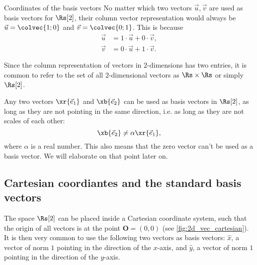 \begin{note}{Coordinates of the basis vectors}{}
  No matter which two vectors $\vec{u}, \vec{v}$ are used as basis vectors for $\Rs[2]$, their column vector representation would always be $\vec{u}=\colvec{1;0}$ and $\vec{v}=\colvec{0;1}$. This is because
  \begin{align*}
    \vec{u} &= 1\cdot\vec{u}+ 0\cdot\vec{v},\\
    \vec{v} &= 0\cdot\vec{u} + 1\cdot\vec{v}.
  \end{align*}
\end{note}

Since the column representation of vectors in $2$-dimensions has two entries, it is common to refer to the set of all $2$-dimensional vectors as $\Rs\times\Rs$ or simply $\Rs[2]$.

Any two vectors $\xr{\vec{e}_{1}}$ and $\xb{\vec{e}_{2}}$ can be used as basis vectors in $\Rs[2]$, as long as they are not pointing in the same direction, i.e. as long as they are not scales of each other:
\begin{equation}
  \xb{\vec{e}_{2}} \neq \alpha\xr{\vec{e}_{1}},
  \label{eq:basis_vectors_not_scales}
\end{equation}
where $\alpha$ is a real number. This also means that the zero vector can't be used as a basis vector. We will elaborate on that point later on.

\subsection{Cartesian coordiantes and the standard basis vectors}

The space $\Rs[2]$ can be placed inside a Cartesian coordinate system, such that the origin of all vectors is at the point $\bm{O}=(0,0)$ (see \autoref{fig:2d_vec_cartesian}). It is then very common to use the following two vectors as basis vectors: $\hat{x}$, a vector of norm $1$ pointing in the direction of the $x$-axis, and $\hat{y}$, a vector of norm $1$ pointing in the direction of the $y$-axis.

\begin{center}
\end{center}

